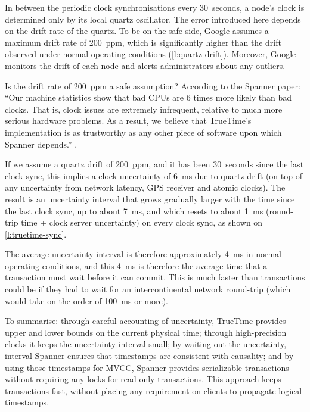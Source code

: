 In between the periodic clock synchronisations every 30~seconds, a node's clock is determined only by its local quartz oscillator.
The error introduced here depends on the drift rate of the quartz.
To be on the safe side, Google assumes a maximum drift rate of 200~ppm, which is significantly higher than the drift observed under normal operating conditions (\autoref{l:quartz-drift}).
Moreover, Google monitors the drift of each node and alerts administrators about any outliers.

Is the drift rate of 200~ppm a safe assumption?
According to the Spanner paper: ``Our machine statistics show that bad CPUs are 6 times more likely than bad clocks.
That is, clock issues are extremely infrequent, relative to much more serious hardware problems.
As a result, we believe that TrueTime's implementation is as trustworthy as any other piece of software upon which Spanner depends.'' \citep{Corbett:2012}.

If we assume a quartz drift of 200~ppm, and it has been 30~seconds since the last clock sync, this implies a clock uncertainty of 6~ms due to quartz drift (on top of any uncertainty from network latency, GPS receiver and atomic clocks).
The result is an uncertainty interval that grows gradually larger with the time since the last clock sync, up to about 7~ms, and which resets to about 1~ms (round-trip time + clock server uncertainty) on every clock sync, as shown on \autoref{l:truetime-sync}.

The average uncertainty interval is therefore approximately 4~ms in normal operating conditions, and this 4~ms is therefore the average time that a transaction must wait before it can commit.
This is much faster than transactions could be if they had to wait for an intercontinental network round-trip (which would take on the order of 100~ms or more).

To summarise: through careful accounting of uncertainty, TrueTime provides upper and lower bounds on the current physical time; through high-precision clocks it keeps the uncertainty interval small; by waiting out the uncertainty, interval Spanner ensures that timestamps are consistent with causality; and by using those timestamps for MVCC, Spanner provides serializable transactions without requiring any locks for read-only transactions.
This approach keeps transactions fast, without placing any requirement on clients to propagate logical timestamps.

